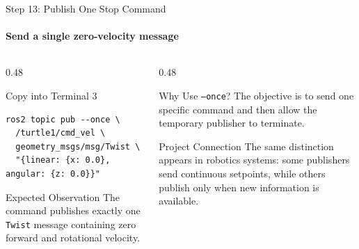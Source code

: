 \begin{frame}[fragile]{Step 13: Publish One Stop Command}
\framesubtitle{Send a single zero-velocity message}

\footnotesize

\begin{columns}[T,onlytextwidth]

    \begin{column}{0.48\textwidth}
        \begin{block}{Copy into Terminal 3}
\begin{verbatim}
ros2 topic pub --once \
  /turtle1/cmd_vel \
  geometry_msgs/msg/Twist \
  "{linear: {x: 0.0}, angular: {z: 0.0}}"
\end{verbatim}
        \end{block}

        \begin{exampleblock}{Expected Observation}
            The command publishes exactly one \texttt{Twist} message containing
            zero forward and rotational velocity.
        \end{exampleblock}
    \end{column}

    \begin{column}{0.48\textwidth}
        \begin{block}{Why Use \texttt{--once}?}
            The objective is to send one specific command and then allow the
            temporary publisher to terminate.
        \end{block}

        \vspace{0.15cm}

        \begin{alertblock}{Project Connection}
            The same distinction appears in robotics systems: some publishers send
            continuous setpoints, while others publish only when new information
            is available.
        \end{alertblock}
    \end{column}

\end{columns}

\end{frame}



